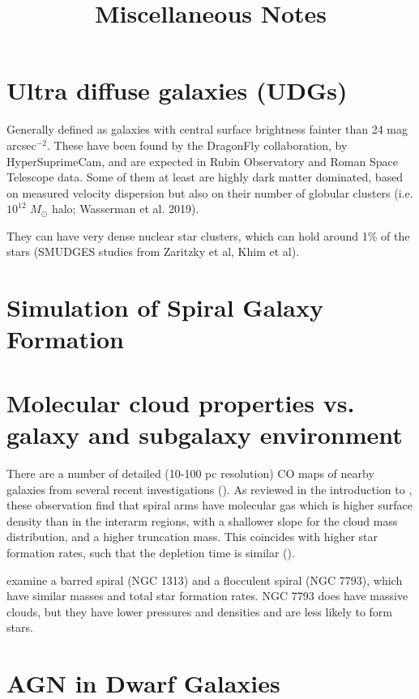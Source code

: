 \documentclass[11pt, preprint]{aastex}
\begin{document}
\title{\bf Miscellaneous Notes}

\section{Ultra diffuse galaxies (UDGs)}

Generally defined as galaxies with central surface brightness fainter
than 24 mag arcsec$^{-2}$. These have been found by the DragonFly
collaboration, by HyperSuprimeCam, and are expected in Rubin
Observatory and Roman Space Telescope data. Some of them at least are
highly dark matter dominated, based on measured velocity dispersion
but also on their number of globular clusters (i.e. $10^{12}$
$M_\odot$ halo; Wasserman et al. 2019).

They can have very dense nuclear star clusters, which can hold around
1\% of the stars (SMUDGES studies from Zaritzky et al, Khim et al).

\section{Simulation of Spiral Galaxy Formation}

\section{Molecular cloud properties vs. galaxy and subgalaxy
  environment}

There are a number of detailed (10-100 pc resolution) CO maps of
nearby galaxies from several recent investigations
(\citealt{schinnerer13a, donovan-meyer13a, leroy21a, koda23a}). As
reviewed in the introduction to \citet{finn23a}, these observation
find that spiral arms have molecular gas which is higher surface
density than in the interarm regions, with a shallower slope for the
cloud mass distribution, and a higher truncation mass. This coincides
with higher star formation rates, such that the depletion time is
similar (\citealt{querejeta21a}).

\citet{finn23a} examine a barred spiral (NGC 1313) and a flocculent
spiral (NGC 7793), which have similar masses and total star formation
rates. NGC 7793 does have massive clouds, but they have lower
pressures and densities and are less likely to form stars.

\section{AGN in Dwarf Galaxies}
\end{document}
